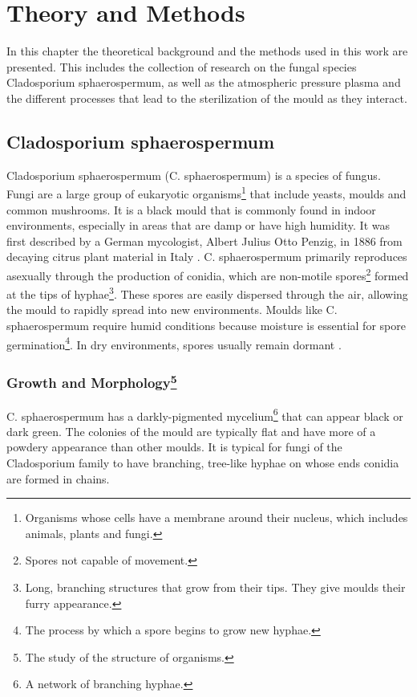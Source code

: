 \chapter{Theory and Methods}
\label{chap:theory}

In this chapter the theoretical background and the methods used in this work are presented. This includes the collection of research on the fungal species Cladosporium sphaerospermum, as well as the atmospheric pressure plasma and the different processes that lead to the sterilization of the mould as they interact. 

\section{Cladosporium sphaerospermum}
Cladosporium sphaerospermum (C. sphaerospermum) is a species of fungus. Fungi are a large group of eukaryotic organisms\footnote{Organisms whose cells have a membrane around their nucleus, which includes animals, plants and fungi.}  that include yeasts, moulds and common mushrooms. It is a black mould that is commonly found in indoor environments, especially in areas that are damp or have high humidity. It was first described by a German mycologist, Albert Julius Otto Penzig, in 1886 from decaying citrus plant material in Italy \cite{mould}. C. sphaerospermum primarily reproduces asexually through the production of conidia, which are non-motile spores\footnote{Spores not capable of movement.} formed at the tips of hyphae\footnote{Long, branching structures that grow from their tips. They give moulds their furry appearance.}. These spores are easily dispersed through the air, allowing the mould to rapidly spread into new environments. Moulds like C. sphaerospermum require humid conditions because moisture is essential for spore germination\footnote{The process by which a spore begins to grow new hyphae.}. In dry environments, spores usually remain dormant \cite{growth}.

\subsection{Growth and Morphology\footnote{The study of the structure of organisms.}}
C. sphaerospermum has a darkly-pigmented mycelium\footnote{A network of branching hyphae.} that can appear black or dark green. The colonies of the mould are typically flat and have more of a powdery appearance than other moulds. It is typical for fungi of the Cladosporium family to have branching, tree-like hyphae on whose ends conidia are formed in chains.

